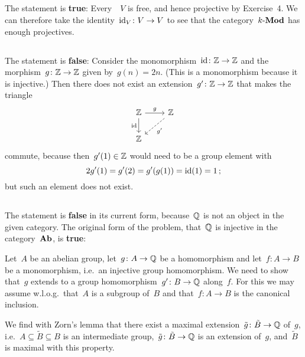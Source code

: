 \subsection{}

The statement is \textbf{true}:
Every~{\kvs}~$V$ is free, and hence projective by Exercise~4.
We can therefore take the identity~$\operatorname{id}_V \colon V \to V$ to see that the category~$\text{$k$-$\mathbf{Mod}$}$ has enough projectives.





\subsection{}

The statement is \textbf{false}:
Consider the monomorphism~$\operatorname{id} \colon \mathbb{Z} \to \mathbb{Z}$ and the morphism~$g \colon \mathbb{Z} \to \mathbb{Z}$ given by~$g(n) = 2n$.
(This is a monomorphism because it is injective.)
Then there does not exist an extension~$g' \colon \mathbb{Z} \to \mathbb{Z}$ that makes the triangle
\[
  \begin{tikzcd}
      \Integer
      \arrow{r}[above]{g}
      \arrow{d}[left]{\id}
    & \Integer
      \arrow[dashed]{dl}[below right]{g'}
    \\
      \Integer
    & {}
  \end{tikzcd}
\]
commute, because then~$g'(1) \in \mathbb{Z}$ would need to be a group element with
\[
    2 g'(1)
  = g'(2)
  = g'(g(1))
  = \operatorname{id}(1)
  = 1 \,;
\]
but such an element does not exist.





\subsection{}

The statement is \textbf{false} in its current form, because~$\mathbb{Q}$ is not an object in the given category.
The original form of the problem, that~$\mathbb{Q}$ is injective in the category~$\mathbf{Ab}$, is \textbf{true}:

Let~$A$ be an abelian group, let~$g \colon A \to \mathbb{Q}$ be a homomorphism and let~$f \colon A \to B$ be a monomorphism, i.e.\ an injective group homomorphism.
We need to show that~$g$ extends to a group homomorphism~$g' \colon B \to \mathbb{Q}$ along~$f$.
For this we may assume w.l.o.g.\ that~$A$ is a subgroup of~$B$ and that~$f \colon A \to B$ is the canonical inclusion.

We find with Zorn’s lemma that there exist a maximal extension~$\tilde{g} \colon \tilde{B} \to \mathbb{Q}$ of~$g$, i.e.~$A \subseteq \tilde{B} \subseteq B$ is an intermediate group,~$\tilde{g} \colon \tilde{B} \to \mathbb{Q}$ is an extension of~$g$, and~$\tilde{B}$ is maximal with this property.

